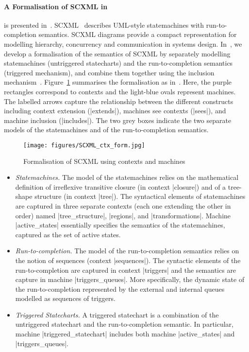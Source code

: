 \paragraph{A Formalisation of SCXML in \EventB} is presented in~\cite{DBLP:conf/ictac/WrightHSB23}.
SCXML~\cite{Barnett2017} describes UML-style statemachines with run-to-completion semantics. SCXML diagrams provide a compact representation for modelling hierarchy, concurrency and communication in systems design. In~\cite{DBLP:conf/ictac/WrightHSB23}, we develop a formalisation of the semantics of SCXML by separately modelling statemachines (untriggered statecharts) and the run-to-completion semantics (triggered mechanism), and combine them together using the inclusion mechanism~\cite{DBLP:conf/iceccs/HoangDSB17}. 
Figure~\ref{fig:SCMXL_ctx_form} summarises the formalisation as in~\cite{DBLP:conf/ictac/WrightHSB23}. Here, the purple rectangles correspond to \EventB contexts and the light-blue ovals represent \EventB machines.  The labelled arrows capture the relationship between the different constructs    including context extension (|extends|), machines see contexts (|sees|), and machine inclusion (|includes|). The two grey boxes indicate the two separate models of the statemachines and of the run-to-completion semantics.
\begin{figure}
    \centering
    \texttt{[image: figures/SCXML\_ctx\_form.jpg]}
    \caption{Formalisation of SCXML using \EventB contexts and machines}
    \label{fig:SCMXL_ctx_form}
\end{figure}
\begin{itemize}
    \item \emph{Statemachines.} The model of the statemachines relies on the mathematical definition of irreflexive transitive closure (in context |closure|) and of a tree-shape structure (in context |tree|). The syntactical elements of statemachines are captured in three separate contexts (each one extending the other in order) named |tree_structure|, |regions|, and |transformations|. Machine |active_states| essentially specifies the semantics of the statemachines, captured as the set of active states.
    \item \emph{Run-to-completion.} The model of the run-to-completion semantics relies on the notion of sequences (context |sequences|). The syntactic elements of the run-to-completion are captured in context |triggers| and the semantics are capture in machine |triggers_queues|. More specifically, the dynamic state of the run-to-completion represented by the external and internal queues modelled as sequences of triggers.

    \item \emph{Triggered Statecharts.} A triggered statechart is a combination of the untriggered statechart and the run-to-completion semantic. In particular, machine |triggered_statechart| includes both machine |active_states| and |triggers_queues|.
\end{itemize}

